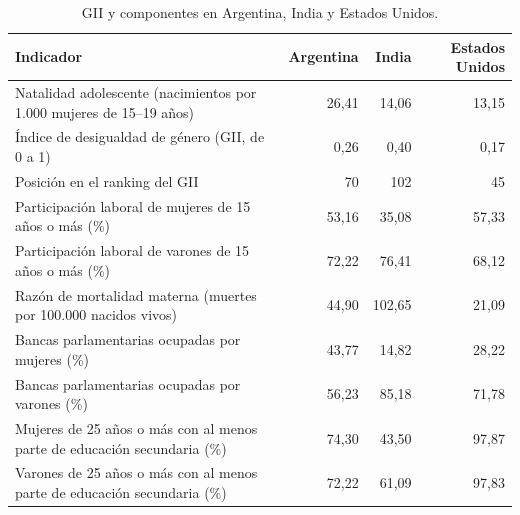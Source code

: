 \begin{table}[H]
\centering
\small
\caption{GII y componentes en Argentina, India y Estados Unidos.}
\label{tab:gii_comparacion}
\renewcommand{\arraystretch}{1.25}
\begin{tabularx}{\textwidth}{>{\raggedright\arraybackslash}Xrrr}
\toprule
\textbf{Indicador} & \textbf{Argentina} & \textbf{India} & \textbf{Estados Unidos} \\
\midrule
Natalidad adolescente (nacimientos por 1.000 mujeres de 15--19 años) & 26,41 & 14,06 & 13,15 \\
Índice de desigualdad de género (GII, de 0 a 1) & 0,26 & 0,40 & 0,17 \\
Posición en el ranking del GII & 70 & 102 & 45 \\
Participación laboral de mujeres de 15 años o más (\%) & 53,16 & 35,08 & 57,33 \\
Participación laboral de varones de 15 años o más (\%) & 72,22 & 76,41 & 68,12 \\
Razón de mortalidad materna (muertes por 100.000 nacidos vivos) & 44,90 & 102,65 & 21,09 \\
Bancas parlamentarias ocupadas por mujeres (\%) & 43,77 & 14,82 & 28,22 \\
Bancas parlamentarias ocupadas por varones (\%) & 56,23 & 85,18 & 71,78 \\
Mujeres de 25 años o más con al menos parte de educación secundaria (\%) & 74,30 & 43,50 & 97,87 \\
Varones de 25 años o más con al menos parte de educación secundaria (\%) & 72,22 & 61,09 & 97,83 \\
\bottomrule
\end{tabularx}
\end{table}

